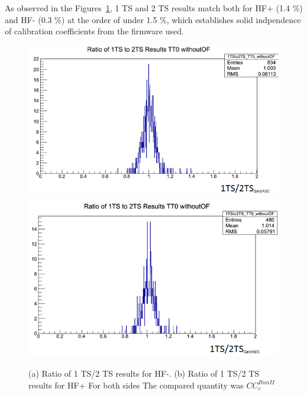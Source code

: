 As observed in the Figures~\ref{fig:HF_1TSto2TS},
1 TS and 2 TS results match both for HF+ (1.4 \%) and HF- (0.3 \%) at the order of under 1.5 \%, which establishes solid indpendence of calibration coefficients from the firmware used.
\begin{figure}[htb]
  \centering
  \includegraphics[width=0.45\linewidth]{figures/ch_hfcalibration/HFM_1TSto2TS_woOF.png}
  \includegraphics[width=0.45\linewidth]{figures/ch_hfcalibration/HFP_1TSto2TS_woOF.png}
  \caption
        {(a) Ratio of 1 TS/2 TS results for HF-.
         (b) Ratio of 1 TS/2 TS results for HF+
         For both sides The compared quantity was ${CC}^{Run II}_{c}$}
  \label{fig:HF_1TSto2TS}
\end{figure}

